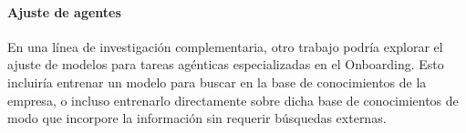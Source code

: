 \paragraph{Ajuste de agentes} En una línea de investigación complementaria, otro trabajo podría explorar el ajuste de modelos para tareas agénticas especializadas en el Onboarding. Esto incluiría entrenar un modelo para buscar en la base de conocimientos de la empresa, o incluso entrenarlo directamente sobre dicha base de conocimientos de modo que incorpore la información sin requerir búsquedas externas.
